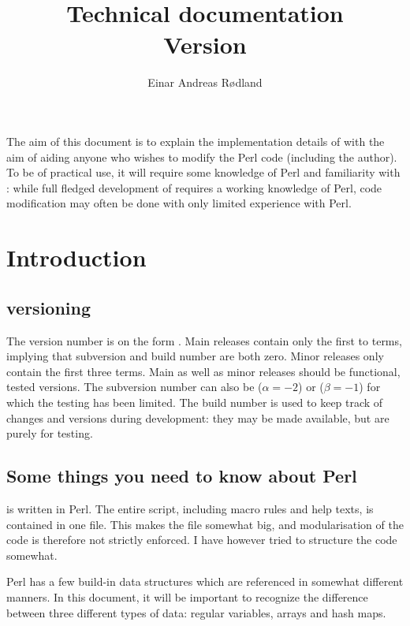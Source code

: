 \documentclass{article}
\title{%
\LARGE \TeXcount\\
\Large Technical documentation\\
\Large Version \version\copyrightfootnote
}
\author{Einar Andreas R{\o}dland}
\begin{document}
\maketitle

{\abstract%
The aim of this document is to explain the implementation details of \TeXcount{} with the aim of aiding anyone who wishes to modify the Perl code (including the author). To be of practical use, it will require some knowledge of Perl and familiarity with \TeXcount{}: while full fledged development of \TeXcount{} requires a working knowledge of Perl, code modification may often be done with only limited experience with Perl.
}

{\scriptsize\tableofcontents}

\pagebreak



\section{Introduction}


\subsection{\TeXcount{} versioning}

The version number is on the form . Main releases contain only the first to terms, implying that subversion and build number are both zero. Minor releases only contain the first three terms. Main as well as minor releases should be functional, tested versions. The subversion number can also be  ($\alpha=-2$) or  ($\beta=-1$) for which the testing has been limited. The build number is used to keep track of changes and versions during development: they may be made available, but are purely for testing.


\subsection{Some things you need to know about Perl}

\TeXcount{} is written in Perl. The entire script, including macro rules and help texts, is contained in one file. This makes the file somewhat big, and modularisation of the code is therefore not strictly enforced. I have however tried to structure the code somewhat.

Perl has a few build-in data structures which are referenced in somewhat different manners. In this document, it will be important to recognize the difference between three different types of data: regular variables, arrays and hash maps.
\end{document}
